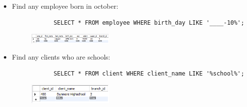 \begin{itemize}
    \item Find any employee born in october:
        \begin{verbatim}
            SELECT * FROM employee WHERE birth_day LIKE '____-10%';
        \end{verbatim}
        \begin{figure}[H]
            \centering
            \includegraphics[width=0.4\textwidth]{./Figs/2020-12-24-21-01-33.png}
        \end{figure}
    
    \item Find any clients who are schools:
        \begin{verbatim}
            SELECT * FROM client WHERE client_name LIKE '%school%';
        \end{verbatim}
        \begin{figure}[H]
            \centering
            \includegraphics[width=0.4\textwidth]{./Figs/2020-12-24-21-01-53.png}
        \end{figure}
\end{itemize}
